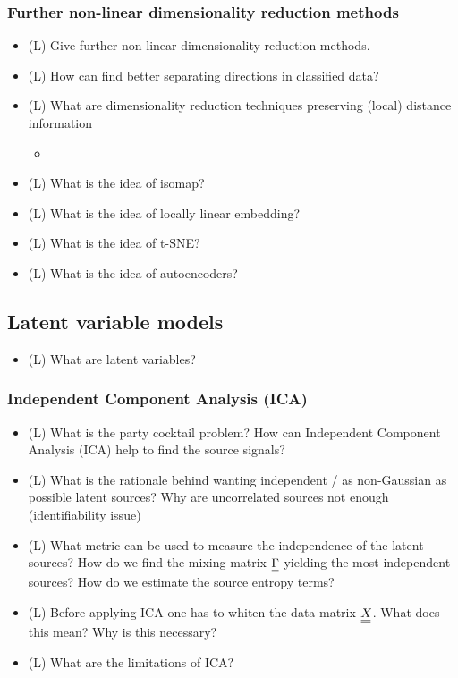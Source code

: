\subsubsection*{Further non-linear dimensionality reduction methods}
\begin{itemize}
    \item (L) Give further non-linear dimensionality reduction methods.
    \item (L) How can find better separating directions in classified data?
    \item (L) What are dimensionality reduction techniques preserving (local) distance information
    \begin{itemize}
        \item {}
    \end{itemize}
    \item (L) What is the idea of isomap?
    \item (L) What is the idea of locally linear embedding?
    \item (L) What is the idea of t-SNE?
    \item (L) What is the idea of autoencoders?
\end{itemize}

\subsection*{Latent variable models}

\begin{itemize}
    \item (L) What are latent variables?
\end{itemize}

\subsubsection*{Independent Component Analysis (ICA)}

\begin{itemize}
    \item (L) What is the party cocktail problem? How can Independent Component Analysis (ICA) help to find the source signals?
    \item (L) What is the rationale behind wanting independent / as non-Gaussian as possible latent sources? Why are uncorrelated sources not enough (identifiability issue)
    \item (L) What metric can be used to measure the independence of the latent sources? How do we find the 
    mixing matrix $\mat{\Gamma}$ yielding the most independent sources? How do we estimate the source entropy terms?
    \item (L) Before applying ICA one has to whiten the data matrix $\mat{X}$. What does this mean? Why is this necessary?
    \item (L) What are the limitations of ICA?
\end{itemize}

